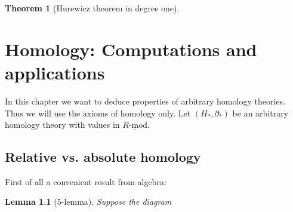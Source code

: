 \documentclass[11pt]{book}
\numberwithin{dummy}{section}
\newtheorem{theorem}{Theorem}[section]
\newtheorem{lemma}[theorem]{Lemma}
\theoremstyle{nonumberbreak}
\newenvironment{pr}[1][]{\ifthenelse{\equal{#1}{}}{\proof}{\proof[#1]}\rm}{\endproof}
\newcommand{\Rmod}{\underline{R\textrm{-}\mathrm{mod}}}
\begin{document}
\begin{spacing}{1.4}
\begin{theorem}[Hurewicz theorem in degree one]
\begin{pr}
\end{pr}

\end{theorem}









































\chapter{Homology: Computations and applications} %
\setlength\abovedisplayshortskip{0pt}
\setlength\belowdisplayshortskip{10pt}
\setlength\abovedisplayskip{10pt}
\setlength\belowdisplayskip{10pt}




In this chapter we want to deduce properties of arbitrary homology theories. Thus we will use the axioms of homology only. Let $(H_*, \partial_*)$ be an arbitrary homology theory with values in $\Rmod$.


\section{Relative vs. absolute homology} %

\thispagestyle{empty}

First of all a convenient result from algebra:


\begin{lemma}[$5$-lemma]
Suppose the diagram


\end{lemma}
\end{spacing}
\end{document}
